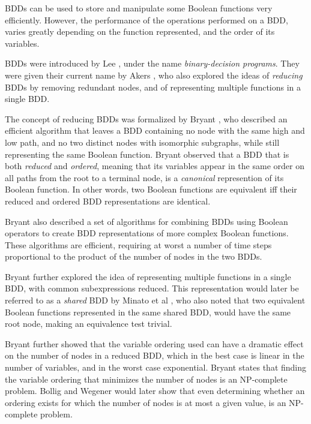 \documentclass[a4paper,11pt]{kth-mag}
\begin{document}

BDDs can be used to store and manipulate some Boolean functions very efficiently.
However, the performance of the operations performed on a BDD, varies greatly depending on the function represented, and the order of its variables.

BDDs were introduced by Lee \cite{lee59}, under the name \emph{binary-decision programs}.
They were given their current name by Akers \cite{akers78}, who also explored the ideas of \emph{reducing} BDDs by removing redundant nodes, and of representing multiple functions in a single BDD.

The concept of reducing BDDs was formalized by Bryant \cite{bryant86}, who described an efficient algorithm that leaves a BDD containing no node with the same high and low path, and no two distinct nodes with isomorphic subgraphs, while still representing the same Boolean function.
Bryant observed that a BDD that is both \emph{reduced} and \emph{ordered}, meaning that its variables appear in the same order on all paths from the root to a terminal node, is a \emph{canonical} represention of its Boolean function.
In other words, two Boolean functions are equivalent iff their reduced and ordered BDD representations are identical.

Bryant also described a set of algorithms for combining BDDs using Boolean operators to create BDD representations of more complex Boolean functions.
These algorithms are efficient, requiring at worst a number of time steps proportional to the product of the number of nodes in the two BDDs.

Bryant further explored the idea of representing multiple functions in a single BDD, with common subexpressions reduced.
This representation would later be referred to as a \emph{shared} BDD by Minato et al \cite{minato90}, who also noted that two equivalent Boolean functions represented in the same shared BDD, would have the same root node, making an equivalence test trivial.

Bryant further showed that the variable ordering used can have a dramatic effect on the number of nodes in a reduced BDD, which in the best case is linear in the number of variables, and in the worst case exponential.
Bryant states that finding the variable ordering that minimizes the number of nodes is an NP-complete problem.
Bollig and Wegener \cite{bollig96} would later show that even determining whether an ordering exists for which the number of nodes is at most a given value, is an NP-complete problem.
\end{document}
